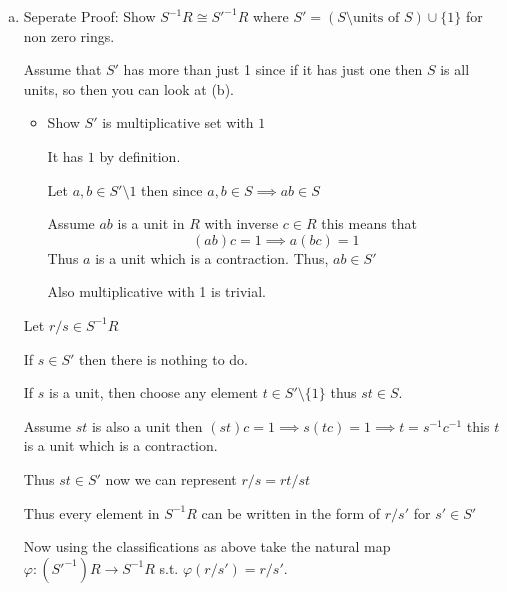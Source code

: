 \documentclass[12pt, letterpaper]{article}
\renewcommand{\t}[1]{\text{#1}}
\begin{document}
\begin{enumerate}[(a)]
\begin{itemize}
        Consider $y = \varphi(b)\varphi(a)^{-1}$ this is well-defined since $a \neq 0$.

        Thus $xy=\varphi(a)\varphi(a)^{-1}\varphi(b)\varphi(b)^{-1}=\varphi(1)\varphi(1)^{-1}=1$.

        \item ($0 \neq 1$) Since two non zero things in $R$ never multiply to zero we get that there is no element $s \in R \setminus \{0\}$ s.t. $s(1-0)=0$. 
    \end{itemize}
    Thus, $Frac(R)$ is a field thus $Frac(Frac(R))=Frac(R)$

    \addtocounter{enumi}{2}\item Seperate Proof: Show $S^{-1}R \cong S'^{-1}R$ where $S'=(S \setminus{\t{units of } S}) \cup \{1\}$ for non zero rings.
    
    Assume that $S'$ has more than just 1 since if it has just one then $S$ is all units, so then you can look at (b).

   \begin{itemize}
    \item  Show $S'$ is multiplicative set with $1$
 
     It has $1$ by definition.
 
     Let $a,b \in S' \setminus {1}$ then since $a,b \in S \implies ab \in S$

     Assume $ab$ is a unit in $R$ with inverse $c \in R$ this means that
     \[(ab)c=1 \implies a(bc)=1\]
     Thus $a$ is a unit which is a contraction. Thus, $ab \in S'$

     Also multiplicative with 1 is trivial.
   \end{itemize}

   Let $r/s \in S^{-1}R$

   If $s \in S'$ then there is nothing to do.

   If $s$ is a unit, then choose any element $t \in S' \setminus \{1\}$ thus $st \in S$.

   Assume $st$ is also a unit then $(st)c=1 \implies s(tc)=1 \implies t=s^{-1}c^{-1}$ this $t$ is a unit which is a contraction.

   Thus $st \in S'$ now we can represent $r/s=rt/st$

   Thus every element in $S^{-1}R$ can be written in the form of $r/s'$ for $s' \in S'$

   Now using the classifications as above take the natural map $\varphi:(S'^{-1})R \to S^{-1}R$ s.t. $\varphi(r/s')=r/s'$.


\end{enumerate}
\end{document}
